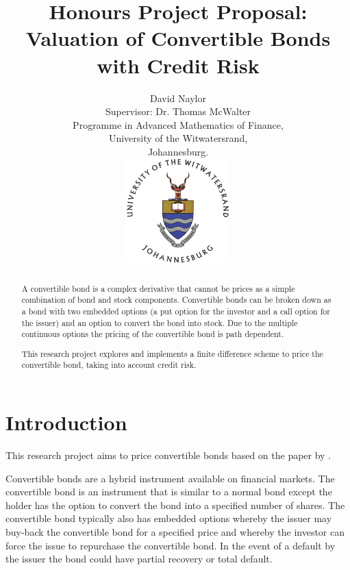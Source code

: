 \documentclass[a4paper,11pt,oneside]{article}
\title{Honours Project Proposal:\\
Valuation of Convertible Bonds with Credit Risk}
\author{David Naylor\\[1cm]
Supervisor: Dr. Thomas McWalter\\[3cm]
Programme in Advanced Mathematics of Finance,\\
University of the Witwatersrand,\\
Johannesburg.\\[2cm]
\includegraphics[width=4cm]{../common/WitsColourLogo}\\[2cm]
}
\newcommand{\setlinespacing}[1]
           {\renewcommand{\baselinestretch}{#1}\small\normalsize}
\begin{document}
\maketitle
\thispagestyle{empty}

\setlinespacing{1.20}
\newpage

\setcounter{page}{1}


\def\abstractname{\Large Abstract}
\begin{abstract}
A convertible bond is a complex derivative that cannot be prices as a simple combination of bond and stock components.  Convertible bonds can be broken down as a bond with two embedded options (a put option for the investor and a call option for the issuer) and an option to convert the bond into stock.  Due to the multiple continuous options the pricing of the convertible bond is path dependent.

This research project explores and implements a finite difference scheme to price the convertible bond, taking into account credit risk.
\end{abstract}



\section{Introduction}
This research project aims to price convertible bonds based on the paper by \citet{AFV03}.

Convertible bonds are a hybrid instrument available on financial markets.  The convertible bond is an instrument that is similar to a normal bond except the holder has the option to convert the bond into a specified number of shares.  The convertible bond typically also has embedded options whereby the issuer may buy-back the convertible bond for a specified price and whereby the investor can force the issue to repurchase the convertible bond.  In the event of a default by the issuer the bond could have partial recovery or total default.
\end{document}
